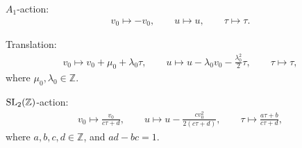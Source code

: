 \documentclass[10pt,a4paper]{amsart}
\numberwithin{equation}{section}
\begin{document}
$A_1$-action:
\begin{gather}
\label{jacobi A1 b}
v_0\mapsto -v_0,\qquad
u\mapsto u, \qquad
\tau\mapsto\tau.
\end{gather}

Translation:
\begin{gather}
\label{jacobi trans b}
v_0\mapsto v_0+\mu_0+\lambda_0\tau,\qquad
u\mapsto u-\lambda_0v_0-\frac{\lambda_0^2}{2}\tau,\qquad
\tau\mapsto\tau,
\end{gather}
where $\mu_0,\lambda_0\in \mathbb{Z}$.

${\rm SL}_2(\mathbb{Z})$-action:
\begin{gather}
\label{jacobi sl2z b}
v_0\mapsto \frac{v_0}{c\tau+d},\qquad
u\mapsto u-\frac{cv_0^2}{2(c\tau+d)},\qquad
\tau\mapsto\frac{a\tau+b}{c\tau+d},
\end{gather}
where $a,b,c,d\in \mathbb{Z}$, and $ad-bc=1$.
\end{document}

